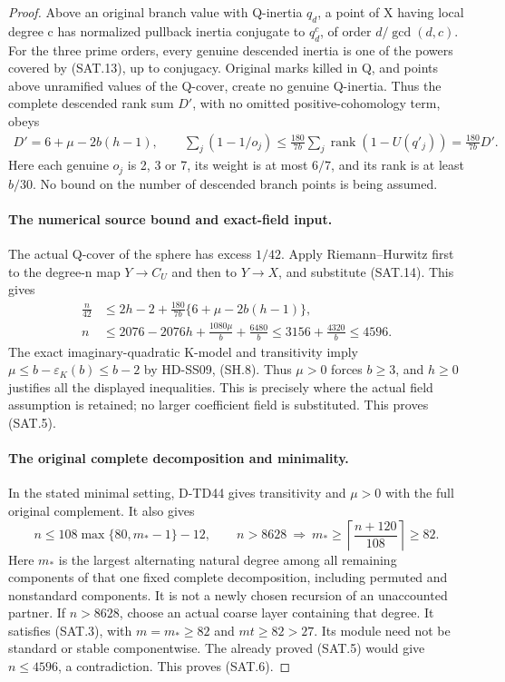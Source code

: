 \begin{proof}
Above an original branch value with Q-inertia \(q_d\), a point
of X having local degree c has normalized pullback inertia
conjugate to \(q_d^c\), of order \(d/\gcd(d,c)\).
For the three prime orders, every genuine descended inertia is
one of the powers covered by (SAT.13), up to conjugacy. Original
marks killed in Q, and points above unramified values of the
Q-cover, create no genuine Q-inertia. Thus the complete descended
rank sum \(D'\), with no omitted positive-cohomology term, obeys
\[
 \begin{gathered}
 D'=6+\mu-2b(h-1),\qquad
 \sum_j(1-1/o_j)
       \le\frac{180}{7b}\sum_j\operatorname{rank}(1-U(q'_j))
       =\frac{180}{7b}D'.
 \end{gathered}
 \tag{SAT.14}
\]
Here each genuine \(o_j\) is 2, 3 or 7, its weight is at most
\(6/7\), and its rank is at least \(b/30\). No bound on the
number of descended branch points is being assumed.

\paragraph{The numerical source bound and exact-field input.}
The actual Q-cover of the sphere has excess \(1/42\). Apply
Riemann--Hurwitz first to the degree-n map \(Y\to C_U\) and
then to \(Y\to X\), and substitute (SAT.14). This gives
\[
 \begin{split}
 \frac n{42}&\le 2h-2+\frac{180}{7b}
                         \{6+\mu-2b(h-1)\},\\
 n&\le2076-2076h+\frac{1080\mu}{b}+\frac{6480}{b}
       \le3156+\frac{4320}{b}\le4596.
 \end{split}
 \tag{SAT.15}
\]
The exact imaginary-quadratic K-model and transitivity imply
\(\mu\le b-\varepsilon_K(b)\le b-2\) by HD-SS09,
(SH.8). Thus \(\mu>0\) forces \(b\ge3\), and \(h\ge0\)
justifies all the displayed inequalities. This is precisely where
the actual field assumption is retained; no larger coefficient
field is substituted. This proves (SAT.5).

\paragraph{The original complete decomposition and minimality.}
In the stated minimal setting, D-TD44 gives transitivity and
\(\mu>0\) with the full original complement. It also gives
\[
 n\le108\max\{80,m_*-1\}-12,\qquad
 n>8628\ \Longrightarrow\
          m_*\ge\left\lceil\frac{n+120}{108}\right\rceil\ge82.
 \tag{SAT.16}
\]
Here \(m_*\) is the largest alternating natural degree among all
remaining components of that one fixed complete decomposition,
including permuted and nonstandard components. It is not a newly
chosen recursion of an unaccounted partner. If \(n>8628\), choose
an actual coarse layer containing that degree. It satisfies
(SAT.3), with \(m=m_*\ge82\) and \(mt\ge82>27\).
Its module need not be standard or stable componentwise. The
already proved (SAT.5) would give \(n\le4596\), a contradiction.
This proves (SAT.6).


\end{proof}

